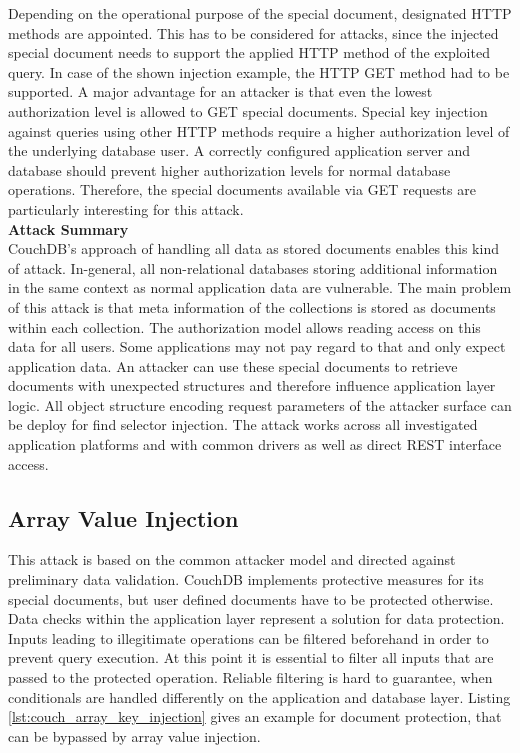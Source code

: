 Depending on the operational purpose of the special document, designated HTTP methods are appointed. This has to be considered for attacks, since the injected special document needs to support the applied HTTP method of the exploited query. In case of the shown injection example, the HTTP GET method had to be supported. A major advantage for an attacker is that even the lowest authorization level is allowed to GET special documents. Special key injection against queries using other HTTP methods require a higher authorization level of the underlying database user. A correctly configured application server and database should prevent higher authorization levels for normal database operations. Therefore, the special documents available via GET requests are particularly interesting for this attack. \\

\textbf{Attack Summary} \\
CouchDB's approach of handling all data as stored documents enables this kind of attack. In-general, all non-relational databases storing additional information in the same context as normal application data are vulnerable. The main problem of this attack is that meta information of the collections is stored as documents within each collection. The authorization model allows reading access on this data for all users. Some applications may not pay regard to that and only expect application data. An attacker can use these special documents to retrieve documents with unexpected structures and therefore influence application layer logic. All object structure encoding request parameters of the attacker surface can be deploy for find selector injection. The attack works across all investigated application platforms and with common drivers as well as direct REST interface access. 

\subsection{Array Value Injection}
This attack is based on the common attacker model and directed against preliminary data validation. CouchDB implements protective measures for its special documents, but user defined documents have to be protected otherwise. Data checks within the application layer represent a solution for data protection. Inputs leading to illegitimate operations can be filtered beforehand in order to prevent query execution. At this point it is essential to filter all inputs that are passed to the protected operation. Reliable filtering is hard to guarantee, when conditionals are handled differently on the application and database layer. Listing \ref{lst:couch_array_key_injection} gives an example for document protection, that can be bypassed by array value injection.\\

